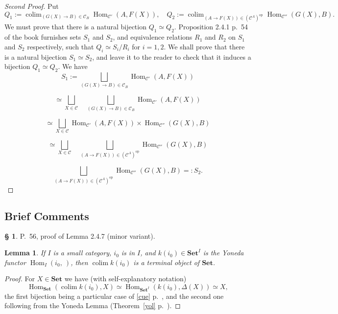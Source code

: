 \documentclass[12pt]{article}%
\newtheorem{lem}[thm]{Lemma}
\theoremstyle{remark}
\theoremstyle{definition}
\newtheorem{s}[thm]{\S}%
\newcommand{\C}{\mathcal C}
\newcommand{\Set}{\mathbf{Set}}
\DeclareMathOperator*{\colim}{colim}
\DeclareMathOperator{\Hom}{Hom}%
\DeclareMathOperator{\op}{op}
\begin{document}
\begin{proof}[Second Proof]
Put 
$$
Q_1:=\colim_{(G(X)\to B)\in\C_B}\Hom_{\C'}(A,F(X)),\quad Q_2:=\colim_{(A\to F(X))\in(\C^A)^{\op}}\Hom_{\C''}(G(X),B).
$$ 
We must prove that there is a natural bijection $Q_1\simeq Q_2$. Proposition 2.4.1 p.~54 of the book furnishes sets $S_1$ and $S_2$, and equivalence relations $R_1$ and $R_2$ on $S_1$ and $S_2$ respectively, such that $Q_i\simeq S_i/R_i$ for $i=1,2$. We shall prove that there is a natural bijection $S_1\simeq S_2$, and leave it to the reader to check that it induces a bijection $Q_1\simeq Q_2$. We have 
$$
S_1:=\bigsqcup_{(G(X)\to B)\in\C_B}\Hom_{\C'}(A,F(X))
$$

$$
\simeq\bigsqcup_{X\in\C}\quad\bigsqcup_{(G(X)\to B)\in\C_B}\Hom_{\C'}(A,F(X))
$$

$$
\simeq\bigsqcup_{X\in\C}\Hom_{\C'}(A,F(X))\times\Hom_{\C''}(G(X),B)
$$

$$
\simeq\bigsqcup_{X\in\C}\quad\bigsqcup_{(A\to F(X))\in(\C^A)^{\op}}\Hom_{\C''}(G(X),B)
$$

$$
\bigsqcup_{(A\to F(X))\in(\C^A)^{\op}}\Hom_{\C''}(G(X),B)=:S_2.
$$
\end{proof}


\subsection{Brief Comments}

\begin{s} 
P.~56, proof of Lemma 2.4.7 (minor variant).

\begin{lem} 
If $I$ is a small category, $i_0$ is in $I$, and $k(i_0)\in\Set^I$ is the Yoneda functor $\Hom_I(i_0,\ )$, then $\colim k(i_0)$ is a terminal object of $\Set$. 
\end{lem}

\begin{proof}
For $X\in\Set$ we have (with self-explanatory notation)
$$
\Hom_{\Set}\left(\colim k(i_0),X\right)\simeq\Hom_{{\Set}^I}(k(i_0),\Delta(X))\simeq X,
$$
the first bijection being a particular case of \eqref{cue} p.~\pageref{cue}, and the second one following from the Yoneda Lemma (Theorem~\ref{yol} p.~\pageref{yol}).
\end{proof}
\end{s}
\end{document}
